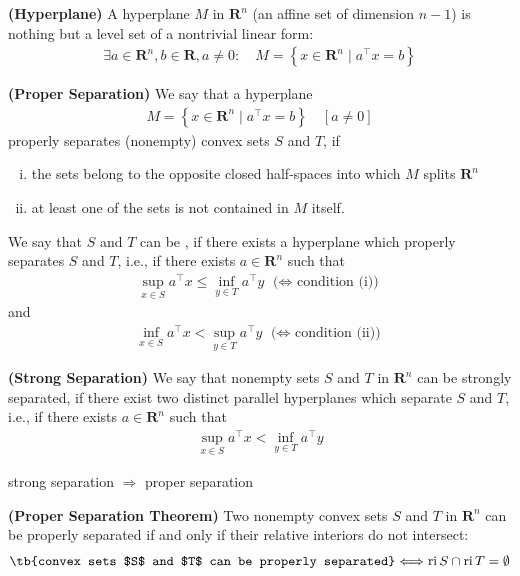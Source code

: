 \documentclass{article}
\newcommand{\bfs}[1]{\textbf{({#1}) }}
\begin{document}
\begin{defa}{\bfs{Hyperplane}}
 A hyperplane $M$ in $\mathbf{R}^{n}$ (an affine set of dimension $n-1$) is nothing but a level set of a nontrivial linear form:
\begin{align*}
\exists a \in \mathbf{R}^{n}, b \in \mathbf{R}, a \neq 0: \quad M=\left\{x \in \mathbf{R}^{n} \mid a^{\top} x=b\right\}
\end{align*}
\end{defa}
\begin{defa}{\bfs{Proper Separation}}
 We say that a hyperplane
\begin{align*}
M=\left\{x \in \mathbf{R}^{n} \mid a^{\top} x=b\right\} \quad[a \neq 0]
\end{align*}
properly separates (nonempty) convex sets $S$ and $T$, if
\begin{enumerate}[(i)]
    \item the sets belong to the opposite closed half-spaces into which $M$ splits $\mathbf{R}^{n}$
    \item  at least one of the sets is not contained in $M$ itself.
\end{enumerate}
We say that $S$ and $T$ can be , if there exists a hyperplane which properly separates $S$ and $T$, i.e., if there exists $a \in \mathbf{R}^{n}$ such that
\begin{align*}
\sup _{x \in S} a^{\top} x \leq \inf _{y \in T} a^{\top} y \text{ ($\Leftrightarrow$ condition (i))}
\end{align*}
and
\begin{align*}
\inf _{x \in S} a^{\top} x<\sup _{y \in T} a^{\top} y \text{ ($\Leftrightarrow$ condition (ii))}
\end{align*}
\end{defa}
\begin{defa}{\bfs{Strong Separation}}
 We say that nonempty sets $S$ and $T$ in $\mathbf{R}^{n}$ can be strongly separated, if there exist two distinct parallel hyperplanes which separate $S$ and $T$, i.e., if there exists $a \in \mathbf{R}^{n}$ such that
\begin{align*}
\sup _{x \in S} a^{\top} x<\inf _{y \in T} a^{\top} y
\end{align*}
\end{defa} 
\begin{rema}
strong separation $\Rightarrow$ proper separation
\end{rema}
\begin{thma}{\bfs{Proper Separation Theorem}}\label{thm:sep_prop}
Two nonempty convex sets $S$ and $T$ in $\mathbf{R}^{n}$ can be properly separated if and only if their relative interiors do not intersect:
\begin{align*}
\text{\tb{convex sets $S$ and $T$ can be properly separated}} \Longleftrightarrow\operatorname{ri} S \cap \operatorname{ri} T=\emptyset
\end{align*}
\end{thma}
\end{document}
